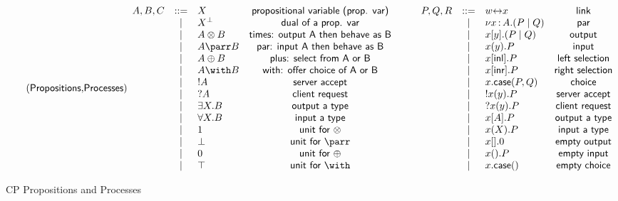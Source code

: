 \begin{figure*}
\begin{gather*}
  \tag{\key{Propositions},\key{Processes}}
  \begin{array}{rclc}
    A,B,C & \bnf & X & \key{propositional variable (prop. var)}\\
          & \alt & \dualbt{X} & \key{dual of a prop. var}\\
          & \alt & A \otimes B & \key{times: output A then behave as B}\\
          & \alt & A \parr B & \key{par: input A then behave as B}\\
          & \alt & A \oplus B & \key{plus: select from A or B}\\
          & \alt & A \with B & \key{with: offer choice of A or B}\\
          & \alt & ! A & \key{server accept}\\
          & \alt & ? A & \key{client request}\\
          & \alt & \exists X . B & \key{output a type}\\
          & \alt & \forall X . B & \key{input a type}\\
          & \alt & 1 & \key{unit for $\otimes$}\\
          & \alt & \bot & \key{unit for $\parr$}\\
          & \alt & 0 & \key{unit for $\oplus$}\\
          & \alt & \top & \key{unit for $\with$}
  \end{array}
  \qquad
  \begin{array}{rclc}
    P,Q,R & \bnf & w \link x & \key{link}\\
          & \alt & \nu x \of{A}.(P \mid Q) & \key{par}\\
          & \alt & x[y].(P \mid Q) & \key{output}\\
          & \alt & x(y).P & \key{input}\\
          & \alt & x[\inlterm].P & \key{left selection}\\
          & \alt & x[\inrterm].P & \key{right selection}\\
          & \alt & x.\caseterm(P,Q) & \key{choice}\\
          & \alt & !x(y).P & \key{server accept}\\
          & \alt & ?x(y).P & \key{client request}\\
          & \alt & x[A].P & \key{output a type}\\
          & \alt & x(X).P & \key{input a type}\\
          & \alt & x[].0 & \key{empty output}\\
          & \alt & x().P & \key{empty input}\\
          & \alt & x.\caseterm() & \key{empty choice}
  \end{array}
\end{gather*}
\caption{CP Propositions and Processes}
\label{fig:cptnts}
\end{figure*}
